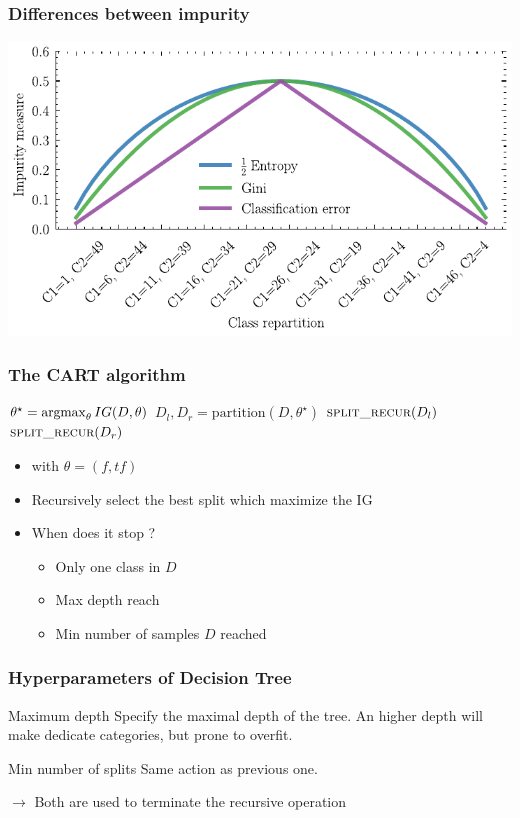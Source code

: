 \documentclass[11pt]{beamer}
\begin{document}
\begin{frame}
  \frametitle{Differences between impurity}
  \includegraphics[width=\textwidth]{impurity_measures}
\end{frame}

\begin{frame}
  \frametitle{The CART algorithm}

  \begin{algorithmic}
       \State $\theta^\star = \operatorname*{argmax}_\theta IG(D,\theta)$
       \State $D_l,D_r = \textrm{partition}(D,\theta^\star)$
       \State $\textsc{split\_recur}(D_l)$
       \State $\textsc{split\_recur}(D_r)$
       \EndIf
       \EndFunction
 \end{algorithmic}
 
  \begin{itemize}
  \item with $\theta = (f,tf)$
  \item Recursively select the best split which maximize the IG
  \item When does it stop ?
    \pause
    \begin{itemize}
    \item Only one class in $D$
    \item Max depth reach
    \item Min number of samples $D$ reached
    \end{itemize}
  \end{itemize}
\end{frame}

\begin{frame}
    \frametitle{Hyperparameters of Decision Tree}
    \begin{block}{Maximum depth}
    Specify the maximal depth of the tree. An higher depth will make dedicate
    categories, but prone to overfit.
    \end{block}
    \vfill
    \begin{block}{Min number of splits}
      Same action as previous one. 
    \end{block}
    \begin{center}

    $\to$ Both are used to terminate the recursive operation
    \end{center}
    
\end{frame}
\end{document}
